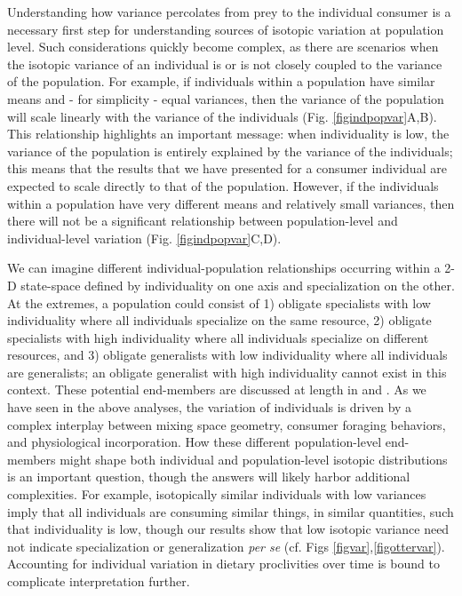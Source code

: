 \documentclass{article}
\begin{document}
Understanding how variance percolates from prey to the individual consumer is a necessary first step for understanding sources of isotopic variation at population level.
Such considerations quickly become complex, as there are scenarios when the isotopic variance of an individual is or is not closely coupled to the variance of the population.
For example, if individuals within a population have similar means and - for simplicity - equal variances, then the variance of the population will scale linearly with the variance of the individuals (Fig. \ref{figindpopvar}A,B).
This relationship highlights an important message: when individuality is low, the variance of the population is entirely explained by the variance of the individuals; this means that the results that we have presented for a consumer individual are expected to scale directly to that of the population.
However, if the individuals within a population have very different means and relatively small variances, then there will not be a significant relationship between population-level and individual-level variation (Fig. \ref{figindpopvar}C,D).

We can imagine different individual-population relationships occurring within a 2-D state-space defined by individuality on one axis and specialization on the other.
At the extremes, a population could consist of
1) obligate specialists with low individuality where all individuals specialize on the same resource,
2) obligate specialists with high individuality where all individuals specialize on different resources, and
3) obligate generalists with low individuality where all individuals are generalists; an obligate generalist with high individuality cannot exist in this context. %
These potential end-members are discussed at length in \citet{Bearhop:2004im} and \citet{Fink:2012eg}.
As we have seen in the above analyses, the variation of individuals is driven by a complex interplay between mixing space geometry, consumer foraging behaviors, and physiological incorporation.
How these different population-level end-members might shape both individual and population-level isotopic distributions is an important question, though the answers will likely harbor additional complexities.
For example, isotopically similar individuals with low variances imply that all individuals are consuming similar things, in similar quantities, such that individuality is low, though our results show that low isotopic variance need not indicate specialization or generalization \emph{per se} (cf. Figs \ref{figvar},\ref{figottervar}).
Accounting for individual variation in dietary proclivities over time is bound to complicate interpretation further.
\end{document}
